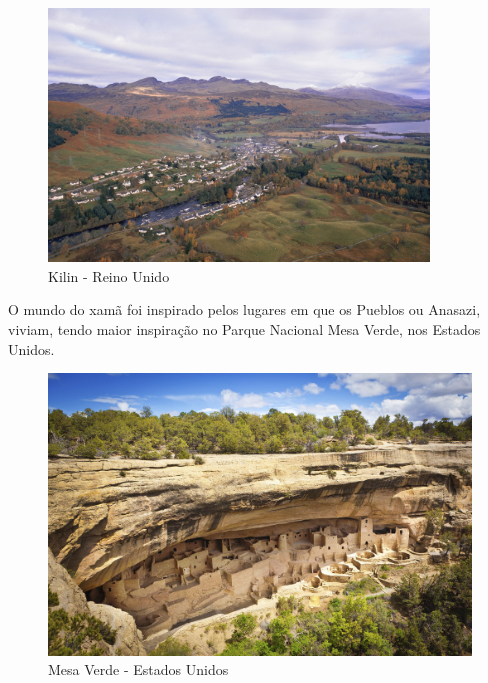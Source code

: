 \begin{figure}[htb]
    \caption{\label{fig_mundoBruxa}Kilin - Reino Unido}
    \begin{center}
        \includegraphics[width=0.9\textwidth]{imagens/kilin.jpg}
    \end{center}
\end{figure}

\clearpage

O mundo do xamã foi inspirado pelos lugares em que os Pueblos ou Anasazi, viviam, tendo maior inspiração no Parque Nacional Mesa Verde, nos Estados Unidos.


\begin{figure}[htb]
    \caption{\label{fig_mundoXaman}Mesa Verde - Estados Unidos}
    \begin{center}
        \includegraphics[width=\textwidth]{imagens/mesaverde.jpg}
    \end{center}
\end{figure}

